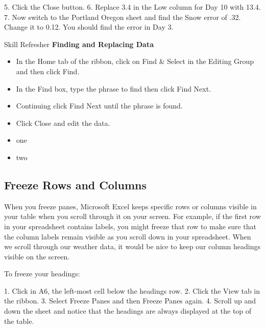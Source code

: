 5. Click the Close button.
6. Replace 3.4 in the Low column for Day 10 with 13.4.
7. Now switch to the Portland Oregon sheet and find the Snow error of .32. Change it to 0.12. You
should find the error in Day 3.

\begin{center}
	\begin{sklbox}{Skill Refresher}
		\textbf{Finding and Replacing Data}
		\\
		\begin{itemize}
			\setlength{\itemsep}{0pt}
			\setlength{\parskip}{0pt}
			\setlength{\parsep}{0pt}

			\item In the Home tab of the ribbon, click on Find \& Select in the Editing Group and then click Find.
			\item In the Find box, type the phrase to find then click Find Next.
			\item Continuing click Find Next until the phrase is found.
			\item Click Close and edit the data.
			
			\item one
			\item two
			
		\end{itemize}
	\end{sklbox}
\end{center}










\subsection{Freeze Rows and Columns}

When you freeze panes, Microsoft Excel keeps specific rows or columns visible in your table when
you scroll through it on your screen. For example, if the first row in your spreadsheet contains labels,
you might freeze that row to make sure that the column labels remain visible as you scroll down in
your spreadsheet. When we scroll through our weather data, it would be nice to keep our column
headings visible on the screen.

To freeze your headings:

1.   Click in A6, the left-most cell below the headings row.
2.   Click the View tab in the ribbon.
3.   Select Freeze Panes and then Freeze Panes again.
4.   Scroll up and down the sheet and notice that the headings are always displayed at the top of the
table.

